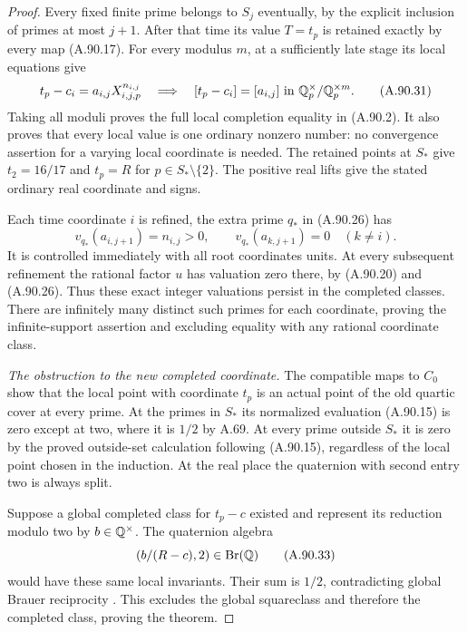 \begin{proof}
Every fixed finite prime belongs to $S_j$
eventually, by the explicit inclusion of
primes at most $j+1$.
After that time its value $T=t_p$ is retained
exactly by every map (A.90.17).
For every modulus $m$, at a sufficiently
late stage its local equations give
\[
       t_p-c_i=a_{i,j}X_{i,j,p}^{n_{i,j}}
             \quad\Longrightarrow\quad
       [t_p-c_i]=[a_{i,j}]
                              \text{ in }\mathbb Q_p^\times/\mathbb Q_p^{\times m}.
 \tag{A.90.31}
\]
Taking all moduli proves the full local
completion equality in (A.90.2).
It also proves that every local value is one
ordinary nonzero number: no convergence
assertion for a varying local coordinate is
needed.
The retained points at $S_*$ give $t_2=16/17$
and $t_p=R$ for $p\in S_*\setminus\{2\}$.
The positive real lifts give the stated
ordinary real coordinate and signs.

Each time coordinate $i$ is refined, the
extra prime $q_*$ in (A.90.26) has
\[
       v_{q_*}(a_{i,j+1})=n_{i,j}>0,\qquad
       v_{q_*}(a_{k,j+1})=0\quad(k\ne i).
 \tag{A.90.32}
\]
It is controlled immediately with all root
coordinates units.
At every subsequent refinement the rational
factor $u$ has valuation zero there, by
(A.90.20) and (A.90.26).
Thus these exact integer valuations persist
in the completed classes.
There are infinitely many distinct such
primes for each coordinate, proving the
infinite-support assertion and excluding
equality with any rational coordinate class.

\emph{The obstruction to the new completed coordinate.}
The compatible maps to $C_0$ show that the
local point with coordinate $t_p$ is an
actual point of the old quartic cover at
every prime.
At the primes in $S_*$ its normalized
evaluation (A.90.15) is zero except at two,
where it is $1/2$ by A.69.
At every prime outside $S_*$ it is zero by
the proved outside-set calculation following
(A.90.15), regardless of the local point
chosen in the induction.
At the real place the quaternion with
second entry two is always split.

Suppose a global completed class for
$t_p-c$ existed and represent its reduction
modulo two by $b\in\mathbb Q^\times$.
The quaternion algebra
\[
                         (b/(R-c),2)
                                   \in\operatorname{Br}(\mathbb Q)
 \tag{A.90.33}
\]
would have these same local invariants.
Their sum is $1/2$, contradicting global
Brauer reciprocity
\cite[Theorem 12.1.8]{AgentCTSkoro2019}.
This excludes the global squareclass and
therefore the completed class, proving the
theorem.
\end{proof}

